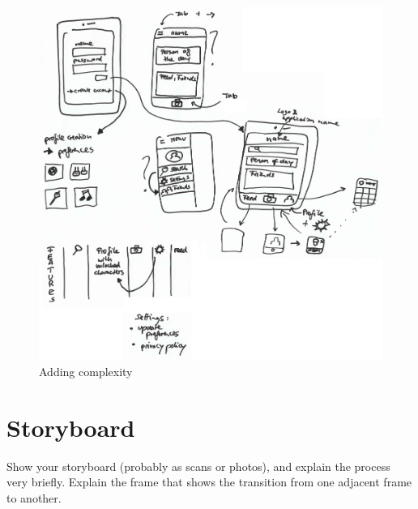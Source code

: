 \documentclass[12pt]{scrartcl}
\begin{document}
	\begin{figure}[H]
        		\centering
       		\includegraphics[width=\textwidth]{../images/design3.jpg}
       		\caption{Adding complexity}
        		\label{sketch3}
	\end{figure}
	
	
\section{Storyboard}
	
	Show your storyboard (probably as scans or photos), and explain the process very briefly. Explain the frame that shows the transition from one adjacent frame to another.
	
\end{document}

